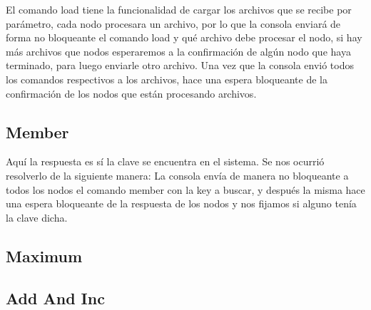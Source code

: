 El comando load tiene la funcionalidad de cargar los archivos que se recibe por parámetro, cada nodo procesara un archivo, por lo que la consola enviará de forma no bloqueante el comando load y qué archivo debe procesar el nodo, si hay más archivos que nodos esperaremos a la confirmación de algún nodo que haya terminado, para luego enviarle otro archivo. Una vez que la consola envió todos los comandos respectivos a los archivos, hace una espera bloqueante de la confirmación de los nodos que están procesando archivos.

\subsection{Member}
Aquí la respuesta es sí la clave se encuentra en el sistema. Se nos ocurrió resolverlo de la siguiente manera: La consola envía de manera no bloqueante a todos los nodos el comando member con la key a buscar, y después la misma hace una espera bloqueante de la respuesta de los nodos y nos fijamos si alguno tenía la clave dicha.

\subsection{Maximum}

\subsection{Add And Inc}


